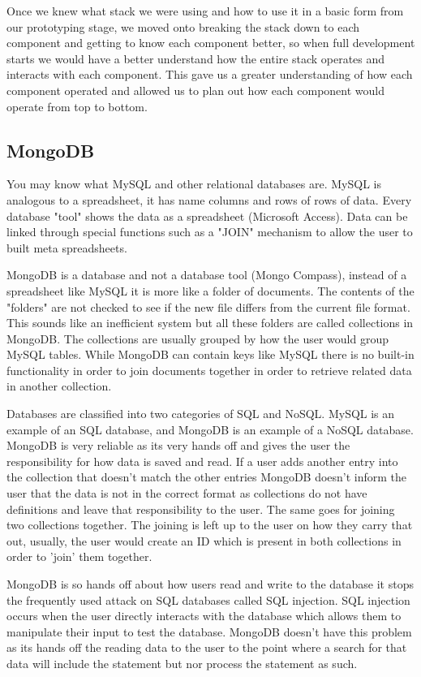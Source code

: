 Once we knew what stack we were using and how to use it in a basic form from our prototyping stage, we moved onto breaking the stack down to each component and getting to know each component better, so when full development starts we would have a better understand how the entire stack operates and interacts with each component. This gave us a greater understanding of how each component operated and allowed us to plan out how each component would operate from top to bottom. 

\subsection{MongoDB}
You may know what MySQL and other relational databases are. MySQL is analogous to a spreadsheet, it has name columns and rows of rows of data. Every database "tool" shows the data as a spreadsheet (Microsoft Access). Data can be linked through special functions such as a "JOIN" mechanism to allow the user to built meta spreadsheets. 

MongoDB is a database and not a database tool (Mongo Compass), instead of a spreadsheet like MySQL it is more like a folder of documents. The contents of the "folders" are not checked to see if the new file differs from the current file format. This sounds like an inefficient system but all these folders are called collections in MongoDB. The collections are usually grouped by how the user would group MySQL tables. While MongoDB can contain keys like MySQL there is no built-in functionality in order to join documents together in order to retrieve related data in another collection.

Databases are classified into two categories of SQL and NoSQL. MySQL is an example of an SQL database, and MongoDB is an example of a NoSQL database. MongoDB is very reliable as its very hands off and gives the user the responsibility for how data is saved and read. If a user adds another entry into the collection that doesn't match the other entries MongoDB doesn't inform the user that the data is not in the correct format as collections do not have definitions and leave that responsibility to the user. The same goes for joining two collections together. The joining is left up to the user on how they carry that out, usually, the user would create an ID which is present in both collections in order to 'join' them together.

MongoDB is so hands off about how users read and write to the database it stops the frequently used attack on SQL databases called SQL injection. SQL injection occurs when the user directly interacts with the database which allows them to manipulate their input to test the database. MongoDB doesn't have this problem as its hands off the reading data to the user to the point where a search for that data will include the statement but nor process the statement as such.

